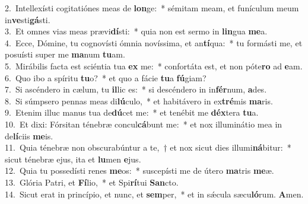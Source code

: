 {2.~}Intellexísti cogitatiónes meas de \textbf{lon}ge:~* sémitam meam, et funículum meum in\textbf{ve}sti\textbf{gá}sti.\\
{3.~}Et omnes vias meas prævi\textbf{dí}sti:~* quia non est sermo in \textbf{lin}gua \textbf{me}a.\\
{4.~}Ecce, Dómine, tu cognovísti ómnia novíssima, et an\textbf{tí}qua:~* tu formásti me, et posuísti super me \textbf{ma}num \textbf{tu}am.\\
{5.~}Mirábilis facta est sciéntia tua \textbf{ex} me:~* confortáta est, et non póte\textbf{ro} ad \textbf{e}am.\\
{6.~}Quo ibo a spíritu \textbf{tu}o?~* et quo a fácie \textbf{tu}a \textbf{fú}giam?\\
{7.~}Si ascéndero in cælum, tu \textbf{il}lic es:~* si descéndero in in\textbf{fér}num, \textbf{a}des.\\
{8.~}Si súmpsero pennas meas di\textbf{lú}culo,~* et habitávero in ex\textbf{tré}mis \textbf{ma}ris.\\
{9.~}Etenim illuc manus tua de\textbf{dú}cet me:~* et tenébit me \textbf{déx}tera \textbf{tu}a.\\
{10.~}Et dixi: Fórsitan ténebræ concul\textbf{cá}bunt me:~* et nox illuminátio mea in de\textbf{lí}ciis \textbf{me}is.\\
{11.~}Quia ténebræ non obscurabúntur a te,~† et nox sicut dies illumi\textbf{ná}bitur:~* sicut ténebræ ejus, ita et \textbf{lu}men \textbf{e}jus.\\
{12.~}Quia tu possedísti renes \textbf{me}os:~* suscepísti me de útero \textbf{ma}tris \textbf{me}æ.\\
{13.~}Glória Patri, et \textbf{Fí}lio,~* et Spi\textbf{rí}tui \textbf{San}cto.\\
{14.~}Sicut erat in princípio, et nunc, et \textbf{sem}per,~* et in sǽcula sæcu\textbf{ló}rum. \textbf{A}men.\\
